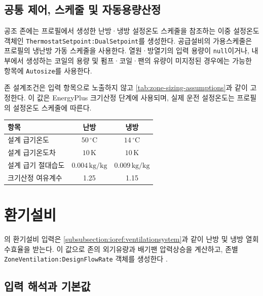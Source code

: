 \subsection{공통 제어, 스케줄 및 자동용량산정}

공조 존에는 프로필에서 생성한 난방·냉방 설정온도 스케줄을 참조하는 이중 설정온도 객체인 \texttt{ThermostatSetpoint:}\allowbreak\texttt{Dual}\allowbreak\texttt{Setpoint}를 생성한다. 공급설비의 가용스케줄은 프로필의 냉난방 가동 스케줄을 사용한다. 열원·방열기의 입력 용량이 \texttt{null}이거나, 내부에서 생성하는 코일의 용량 및 펌프·코일·팬의 유량이 미지정된 경우에는 가능한 항목에 \texttt{Autosize}를 사용한다.

존 설계조건은 입력 항목으로 노출하지 않고 \cref{tab:zone-sizing-assumptions}과 같이 고정한다. 이 값은 EnergyPlus 크기산정 단계에 사용되며, 실제 운전 설정온도는 프로필의 설정온도 스케줄에 따른다.

\begin{defaulttable}
  \caption{냉난방 존 자동용량산정의 고정 설계조건}
  \label{tab:zone-sizing-assumptions}
  \begin{tabular}{lcc}
    \toprule
    항목 & 난방 & 냉방 \\ \midrule
    설계 급기온도 & $50\,^{\circ}\mathrm{C}$ & $14\,^{\circ}\mathrm{C}$ \\
    설계 급기온도차 & $10\,\mathrm{K}$ & $10\,\mathrm{K}$ \\
    설계 급기 절대습도 & $0.004\,\mathrm{kg/kg}$ & $0.009\,\mathrm{kg/kg}$ \\
    크기산정 여유계수 & 1.25 & 1.15 \\ \bottomrule
  \end{tabular}
\end{defaulttable}

\section{환기설비}
\label{section:ventilation-conversion}

\simulator 의 환기설비 입력은 \cref{subsubsection:ioref:ventilationsystem}과 같이 난방 및 냉방 열회수효율을 받는다. 이 값으로 존의 외기유량과 배기팬 압력상승을 계산하고, 존별 \texttt{ZoneVentilation:DesignFlowRate} 객체를 생성한다 \cite{energyplusior242}.

\subsection{입력 해석과 기본값}

